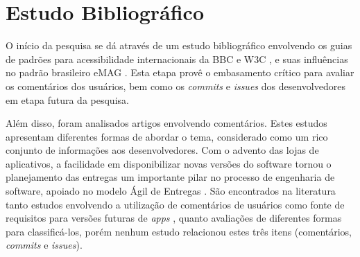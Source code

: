\documentclass[
	12pt,				%
	oneside,			%
	a4paper,			%
	english,			%
	brazil				%
	]{abntex2ppgsi}
\begin{document}
\section{Estudo Bibliográfico}
O início da pesquisa se dá através de um estudo bibliográfico envolvendo os guias de padrões para acessibilidade internacionais da BBC \cite{bbc} e W3C \cite{wcag}, e suas influências no padrão brasileiro eMAG \cite{emag}. Esta etapa provê o embasamento crítico para avaliar os comentários dos usuários, bem como os \textit{commits} e \textit{issues} dos desenvolvedores em etapa futura da pesquisa.

Além disso, foram analisados artigos envolvendo comentários. Estes estudos apresentam diferentes formas de abordar o tema, considerado como um rico conjunto de informações aos desenvolvedores. Com o advento das lojas de aplicativos, a facilidade em disponibilizar novas versões do software tornou o planejamento das entregas um importante pilar no processo de engenharia de software, apoiado no modelo Ágil de Entregas \cite{manifestoagil}. São encontrados na literatura tanto estudos envolvendo a utilização de comentários de usuários como fonte de requisitos para versões futuras de \textit{apps} \cite{Ciurumelea2017analyzing,Li2018MobileAE,Ortega2015thesis,Palomba2015userreviews}, quanto avaliações de diferentes formas para classificá-los\cite{Panichella2015how,Pelloni2018becloma,Sorbo2017surf}, porém nenhum estudo relacionou estes três itens (comentários, \textit{commits} e \textit{issues}).
\end{document}
